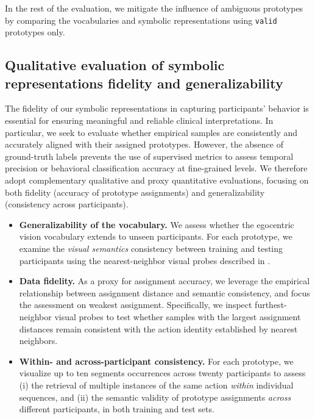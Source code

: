         In the rest of the evaluation, we mitigate the influence of ambiguous prototypes by comparing the vocabularies and symbolic representations using \texttt{valid} prototypes only.


    \subsection{Qualitative evaluation of symbolic representations fidelity and generalizability}
        \label{sec:chapter_5_results_symbolic_eval}

        The fidelity of our symbolic representations in capturing participants’ behavior is essential for ensuring meaningful and reliable clinical interpretations. In particular, we seek to evaluate whether empirical samples are consistently and accurately aligned with their assigned prototypes. However, the absence of ground-truth labels prevents the use of supervised metrics to assess temporal precision or behavioral classification accuracy at fine-grained levels. We therefore adopt complementary qualitative and proxy quantitative evaluations, focusing on both fidelity (accuracy of prototype assignments) and generalizability (consistency across participants).  

        \begin{itemize}
            \item \textbf{Generalizability of the vocabulary.}  
            We assess whether the egocentric vision vocabulary extends to unseen participants. For each prototype, we examine the \textit{visual semantics} consistency between training and testing participants using the nearest-neighbor visual probes described in .  

            \item \textbf{Data fidelity.}  
            As a proxy for assignment accuracy, we leverage the empirical relationship between assignment distance and semantic consistency, and focus the assessment on weakest assignment. Specifically, we inspect furthest-neighbor visual probes to test whether samples with the largest assignment distances remain consistent with the action identity established by nearest neighbors.  

            \item \textbf{Within- and across-participant consistency.}  
            For each prototype, we visualize up to ten segments occurrences across twenty participants to assess (i) the retrieval of multiple instances of the same action \textit{within} individual sequences, and (ii) the semantic validity of prototype assignments \textit{across} different participants, in both training and test sets.  
        \end{itemize}


